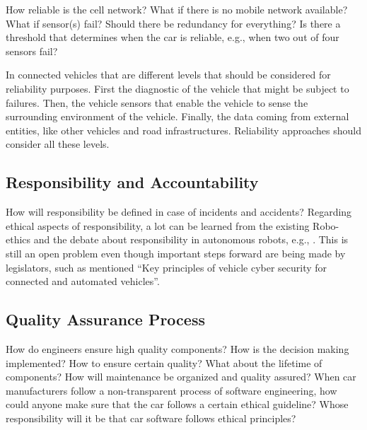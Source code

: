 How reliable is the cell network? What if there is no mobile network available? What if sensor(s) fail? Should there be redundancy for everything? Is there a threshold that determines when the car is reliable, e.g., when two out of four sensors fail?  

In connected vehicles that are different levels that should be considered for reliability purposes. First the diagnostic of the vehicle that might be subject to failures. Then, the vehicle sensors that enable the vehicle to sense the surrounding environment of the vehicle. Finally, the data coming from external entities, like other vehicles and road infrastructures. Reliability approaches should consider all these levels.


\subsection{Responsibility and Accountability}
\label{sec:EAofTC:ResponsibilityAndAccountability}

How will responsibility be defined in case of incidents and accidents? Regarding ethical aspects of responsibility, a lot can be learned from the existing Robo-ethics and the debate about responsibility in autonomous robots, e.g., \cite{Dodig-Crnkovic:2008:SMR:1566864.1566888}. This is still an open problem even though important steps forward are being made by legislators, such as mentioned \enquote{Key principles of vehicle cyber security for connected and automated vehicles}.


\subsection{Quality Assurance Process}
\label{sec:EAofTC:QualityAssuranceProcess}

How do engineers ensure high quality components? How is the decision making implemented? How to ensure certain quality? What about the lifetime of components? How will maintenance be organized and quality assured?
When car manufacturers follow a non-transparent process of software engineering, how could anyone make sure that the car follows a certain ethical guideline? Whose responsibility will it be that car software follows ethical principles?

